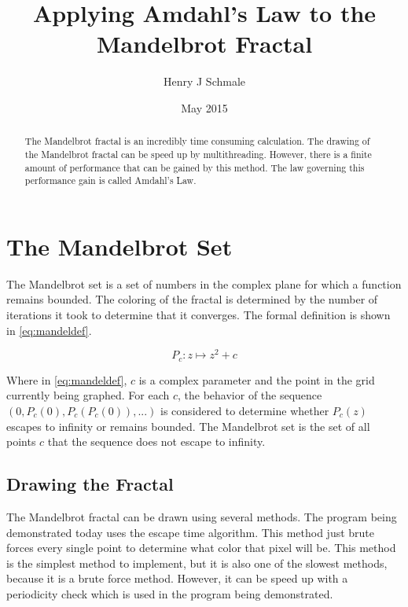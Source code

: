 \documentclass[11pt,oneside,letterpaper]{article}
\begin{document}
\title{Applying Amdahl's Law to the Mandelbrot Fractal}
\author{Henry J Schmale}
\date{May 2015}
\maketitle

\begin{abstract}
The Mandelbrot fractal is an incredibly time consuming calculation.
The drawing of the Mandelbrot fractal can be speed up by multithreading.
However, there is a finite amount of performance that can be gained by
this method. The law governing this performance gain is called Amdahl's
Law.
\end{abstract}

\section{The Mandelbrot Set}
The Mandelbrot set is a set of numbers in the complex plane for which
a function remains bounded. The coloring of the fractal is determined
by the number of iterations it took to determine that it converges.
The formal definition is shown in \eqref{eq:mandeldef}.

\begin{equation}\label{eq:mandeldef}
    P_{c}: z \mapsto z^2 + c    
\end{equation}

Where in \eqref{eq:mandeldef}, $c$ is a complex parameter and the point
in the grid currently being graphed. For each $c$, the behavior of the
sequence $(0, P_{c}(0), P_{c}(P_{c}(0)),...)$ is considered to determine
whether $P_{c}(z)$ escapes to infinity or remains bounded. The Mandelbrot
set is the set of all points $c$ that the sequence does not escape to
infinity.

\subsection{Drawing the Fractal}
The Mandelbrot fractal can be drawn using several methods. The
program being demonstrated today uses the escape time algorithm.
This method just brute forces every single point to determine what color
that pixel will be. This method is the simplest method to implement, but
it is also one of the slowest methods, because it is a brute force method.
However, it can be speed up with a periodicity check which is used in the
program being demonstrated.


\end{document}

